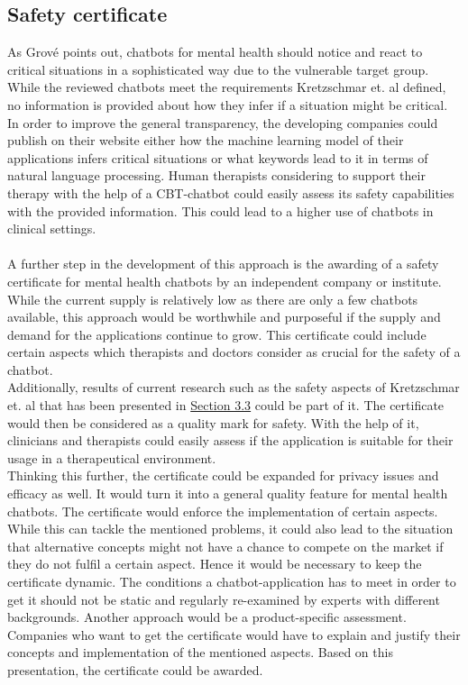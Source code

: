 \documentclass[sigconf, nonacm]{acmart}
\begin{document}
\subsection{Safety certificate}
\label{sec:four_three}
As Grové \cite{Grove2021} points out, chatbots for mental health should notice and react to critical situations in a sophisticated way due to the vulnerable target group. While the reviewed chatbots meet the requirements Kretzschmar et. al \cite{Kretzschmar2019} defined,
no information is provided about how they infer if a situation might be critical. In order to improve the general transparency, the developing companies could publish on their website either how the machine learning model of their applications infers 
critical situations or what keywords lead to it in terms of natural language processing. Human therapists considering to support their therapy with the help of a CBT-chatbot could easily assess its safety capabilities with the provided information. This could lead to a higher use of chatbots in clinical settings.\\
\\
A further step in the development of this approach is the awarding of a safety certificate for mental health chatbots by an independent company or institute. While the current supply is relatively low as there are only a few chatbots available, this approach would be worthwhile and purposeful if the supply and demand for the applications continue to grow. 
This certificate could include certain aspects which therapists and doctors consider as crucial for the safety of a chatbot.\\ 
Additionally, results of current research such as the safety aspects of Kretzschmar et. al \cite{Kretzschmar2019} that has been presented in \hyperref[sec:three_three]{Section 3.3} could be part of it.  
The certificate would then be considered as a quality mark for safety.
With the help of it, clinicians and therapists could easily assess if the application is suitable for their usage in a therapeutical environment.\\
Thinking this further, the certificate could be expanded for privacy issues and efficacy as well. It would turn it into a general quality feature for mental health chatbots. The certificate would enforce the implementation of certain aspects. While this can tackle the mentioned problems, it could also lead to the situation
that alternative concepts might not have a chance to compete on the market if they do not fulfil a certain aspect. Hence it would be necessary to keep the certificate dynamic. The conditions a chatbot-application has to meet in order to get it should not be static and regularly re-examined by experts with different backgrounds.
Another approach would be a product-specific assessment. Companies who want to get the certificate would have to explain and justify their concepts and implementation of the mentioned aspects. Based on this presentation, the certificate could be awarded.
\end{document}
